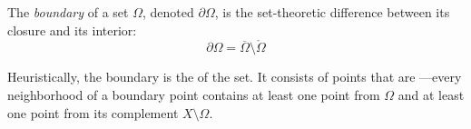 \begin{math-stroke}
\begin{definition}[Boundary]\label{def:boundary}
The \emph{boundary} of a set $\Omega$, denoted $\partial \Omega$, is the set-theoretic difference between its closure and its interior:
\[ \partial \Omega = \overline{\Omega} \setminus \mathring{\Omega} \]
\end{definition}

\begin{center}
\end{center}

\begin{explanation-of-steps}
Heuristically, the boundary is the  of the set. It consists of points that are —every neighborhood of a boundary point contains at least one point from $\Omega$ and at least one point from its complement $X \setminus \Omega$.
\end{explanation-of-steps}
\end{math-stroke}


